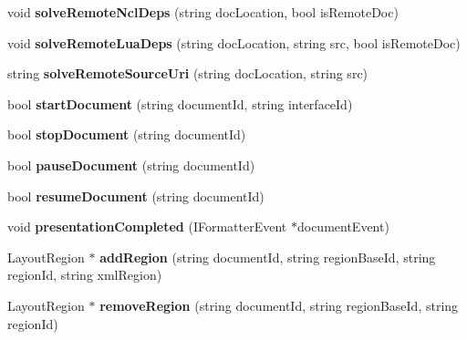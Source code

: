 \begin{CompactItemize}
\item 
void \textbf{solveRemoteNclDeps} (string docLocation, bool isRemoteDoc)\label{classbr_1_1pucrio_1_1telemidia_1_1ginga_1_1ncl_1_1FormatterMediator_48ee6c218f69381e4e8b7d4be0247d3d}

\item 
void \textbf{solveRemoteLuaDeps} (string docLocation, string src, bool isRemoteDoc)\label{classbr_1_1pucrio_1_1telemidia_1_1ginga_1_1ncl_1_1FormatterMediator_0553bba30bb25f263208a785a56a9e85}

\item 
string \textbf{solveRemoteSourceUri} (string docLocation, string src)\label{classbr_1_1pucrio_1_1telemidia_1_1ginga_1_1ncl_1_1FormatterMediator_e35a020be5dcf286bd78d2b0f23d5092}

\item 
bool \textbf{startDocument} (string documentId, string interfaceId)\label{classbr_1_1pucrio_1_1telemidia_1_1ginga_1_1ncl_1_1FormatterMediator_76a626c336998d3df4777074d082ff4f}

\item 
bool \textbf{stopDocument} (string documentId)\label{classbr_1_1pucrio_1_1telemidia_1_1ginga_1_1ncl_1_1FormatterMediator_069bb6948f8ba2a14488e23c6d808772}

\item 
bool \textbf{pauseDocument} (string documentId)\label{classbr_1_1pucrio_1_1telemidia_1_1ginga_1_1ncl_1_1FormatterMediator_02c4e86ced2b5d1e370f15d163af93ec}

\item 
bool \textbf{resumeDocument} (string documentId)\label{classbr_1_1pucrio_1_1telemidia_1_1ginga_1_1ncl_1_1FormatterMediator_b9f55a5fbf515eb17a0bc677448c04ee}

\item 
void \textbf{presentationCompleted} (IFormatterEvent $\ast$documentEvent)\label{classbr_1_1pucrio_1_1telemidia_1_1ginga_1_1ncl_1_1FormatterMediator_f187f853b10c1acebd99ad0ab862ab42}

\item 
LayoutRegion $\ast$ \textbf{addRegion} (string documentId, string regionBaseId, string regionId, string xmlRegion)\label{classbr_1_1pucrio_1_1telemidia_1_1ginga_1_1ncl_1_1FormatterMediator_45200d403e40ab0e38040063ce76cfc8}

\item 
LayoutRegion $\ast$ \textbf{removeRegion} (string documentId, string regionBaseId, string regionId)\label{classbr_1_1pucrio_1_1telemidia_1_1ginga_1_1ncl_1_1FormatterMediator_961c5e8fd2a9d9109d8042a5f0c96c5d}


\end{CompactItemize}
